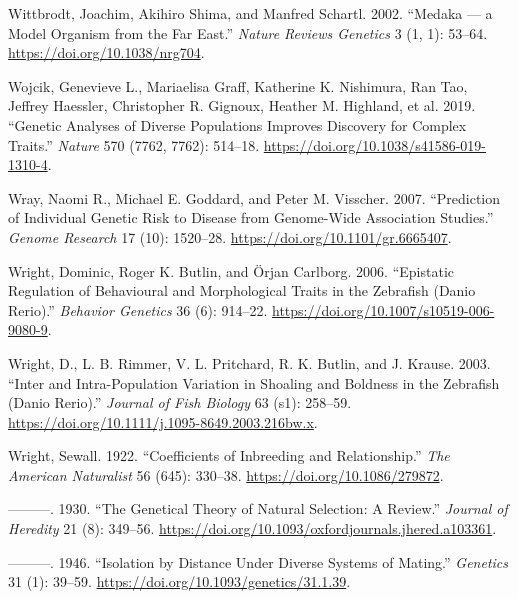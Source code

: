 \documentclass[
]{book}
\newlength{\cslhangindent}
\newlength{\cslentryspacingunit} %
\newenvironment{CSLReferences}[2] %
 {%
  \setlength{\parindent}{0pt}
  \ifodd #1
  \let\oldpar\par
  \def\par{\hangindent=\cslhangindent\oldpar}
  \fi
  \setlength{\parskip}{#2\cslentryspacingunit}
 }%
 {}
\begin{document}
\begin{CSLReferences}{1}{0}
\leavevmode{}%
Wittbrodt, Joachim, Akihiro Shima, and Manfred Schartl. 2002. {``Medaka --- a Model Organism from the Far East.''} \emph{Nature Reviews Genetics} 3 (1, 1): 53--64. \url{https://doi.org/10.1038/nrg704}.

\leavevmode{}%
Wojcik, Genevieve L., Mariaelisa Graff, Katherine K. Nishimura, Ran Tao, Jeffrey Haessler, Christopher R. Gignoux, Heather M. Highland, et al. 2019. {``Genetic Analyses of Diverse Populations Improves Discovery for Complex Traits.''} \emph{Nature} 570 (7762, 7762): 514--18. \url{https://doi.org/10.1038/s41586-019-1310-4}.

\leavevmode{}%
Wray, Naomi R., Michael E. Goddard, and Peter M. Visscher. 2007. {``Prediction of Individual Genetic Risk to Disease from Genome-Wide Association Studies.''} \emph{Genome Research} 17 (10): 1520--28. \url{https://doi.org/10.1101/gr.6665407}.

\leavevmode{}%
Wright, Dominic, Roger K. Butlin, and Örjan Carlborg. 2006. {``Epistatic Regulation of Behavioural and Morphological Traits in the Zebrafish ({Danio} Rerio).''} \emph{Behavior Genetics} 36 (6): 914--22. \url{https://doi.org/10.1007/s10519-006-9080-9}.

\leavevmode{}%
Wright, D., L. B. Rimmer, V. L. Pritchard, R. K. Butlin, and J. Krause. 2003. {``Inter and Intra-Population Variation in Shoaling and Boldness in the Zebrafish ({Danio} Rerio).''} \emph{Journal of Fish Biology} 63 (s1): 258--59. \url{https://doi.org/10.1111/j.1095-8649.2003.216bw.x}.

\leavevmode{}%
Wright, Sewall. 1922. {``Coefficients of {Inbreeding} and {Relationship}.''} \emph{The American Naturalist} 56 (645): 330--38. \url{https://doi.org/10.1086/279872}.

\leavevmode{}%
---------. 1930. {``The {Genetical Theory} of {Natural Selection}: {A Review}.''} \emph{Journal of Heredity} 21 (8): 349--56. \url{https://doi.org/10.1093/oxfordjournals.jhered.a103361}.

\leavevmode{}%
---------. 1946. {``Isolation by {Distance} Under {Diverse Systems} of {Mating}.''} \emph{Genetics} 31 (1): 39--59. \url{https://doi.org/10.1093/genetics/31.1.39}.


\end{CSLReferences}
\end{document}
